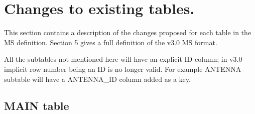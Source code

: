 \documentclass{article}
\begin{document}
\section{Changes to existing tables.}

This section contains a description of the changes proposed for each
table in the MS definition. Section 5 gives a full definition of the v3.0 MS
format.

All the subtables not mentioned here will have an explicit ID column;
in v3.0 implicit row number being an ID is no longer valid. For
example ANTENNA subtable will have a ANTENNA\_ID column added as a key.

\subsection{MAIN table}
\end{document}
